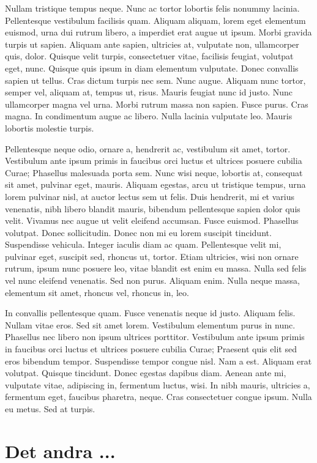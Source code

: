 \documentclass[a4paper,11pt]{kth-mag}
\begin{document}
Nullam tristique tempus neque. Nunc ac tortor lobortis felis nonummy
lacinia. Pellentesque vestibulum facilisis quam. Aliquam aliquam,
lorem eget elementum euismod, urna dui rutrum libero, a imperdiet erat
augue ut ipsum. Morbi gravida turpis ut sapien. Aliquam ante sapien,
ultricies at, vulputate non, ullamcorper quis, dolor. Quisque velit
turpis, consectetuer vitae, facilisis feugiat, volutpat eget, nunc.
Quisque quis ipsum in diam elementum vulputate. Donec convallis sapien
ut tellus. Cras dictum turpis nec sem. Nunc augue. Aliquam nunc
tortor, semper vel, aliquam at, tempus ut, risus. Mauris feugiat nunc
id justo. Nunc ullamcorper magna vel urna. Morbi rutrum massa non
sapien. Fusce purus. Cras magna. In condimentum augue ac libero. Nulla
lacinia vulputate leo. Mauris lobortis molestie turpis.

Pellentesque neque odio, ornare a, hendrerit ac, vestibulum sit amet,
tortor. Vestibulum ante ipsum primis in faucibus orci luctus et
ultrices posuere cubilia Curae; Phasellus malesuada porta sem. Nunc
wisi neque, lobortis at, consequat sit amet, pulvinar eget, mauris.
Aliquam egestas, arcu ut tristique tempus, urna lorem pulvinar nisl,
at auctor lectus sem ut felis. Duis hendrerit, mi et varius venenatis,
nibh libero blandit mauris, bibendum pellentesque sapien dolor quis
velit. Vivamus nec augue ut velit eleifend accumsan. Fusce euismod.
Phasellus volutpat. Donec sollicitudin. Donec non mi eu lorem suscipit
tincidunt. Suspendisse vehicula. Integer iaculis diam ac quam.
Pellentesque velit mi, pulvinar eget, suscipit sed, rhoncus ut,
tortor. Etiam ultricies, wisi non ornare rutrum, ipsum nunc posuere
leo, vitae blandit est enim eu massa. Nulla sed felis vel nunc
eleifend venenatis. Sed non purus. Aliquam enim. Nulla neque massa,
elementum sit amet, rhoncus vel, rhoncus in, leo.

In convallis pellentesque quam. Fusce venenatis neque id justo.
Aliquam felis. Nullam vitae eros. Sed sit amet lorem. Vestibulum
elementum purus in nunc. Phasellus nec libero non ipsum ultrices
porttitor. Vestibulum ante ipsum primis in faucibus orci luctus et
ultrices posuere cubilia Curae; Praesent quis elit sed eros bibendum
tempor. Suspendisse tempor congue nisl. Nam a est. Aliquam erat
volutpat. Quisque tincidunt. Donec egestas dapibus diam. Aenean ante
mi, vulputate vitae, adipiscing in, fermentum luctus, wisi. In nibh
mauris, ultricies a, fermentum eget, faucibus pharetra, neque. Cras
consectetuer congue ipsum. Nulla eu metus. Sed at turpis.

\chapter{Det andra ...}
\end{document}
